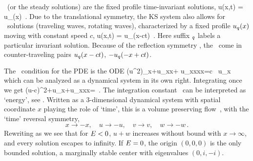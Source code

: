 
\Eqva\  (or the steady solutions)
are the fixed profile time-invariant solutions,
\beq
 u(x,t) = u_\stagn(x) %
\,.
Due to the translational symmetry,
the KS system also allows for \reqv\ solutions
(traveling waves, rotating waves),
characterized by a fixed profile $u_\stagn(x)$
moving with constant speed $c$, {\ie}
\beq
 u(x,t) =  u_\stagn(x-ct) %
\,.
Here suffix ${}_\stagn$ labels a particular invariant solution.
Because of the reflection symmetry ,
the \reqva\ come in counter-traveling pairs
$u_\stagn(x-ct)$, $-u_\stagn(-x+ct)$.

The \reqv\ condition for the {\KS} PDE 
is the ODE
\beq
{\textstyle{}}(u^2)_x+u_{xx}+ u_{xxxx}=c \, u_x
which can be analyzed as a dynamical system in its own right.
Integrating once we get
\beq
{\textstyle{}}(u-c)^2+u_x+u_{xxx}=\expctE
\,.
\label{eq:stdks}
\eeq
The integration constant \expctE\ can be interpreted as `energy',
see .
Written as a 3-dimen\-si\-on\-al dynamical system
with spatial coordinate $x$ playing the role of `time',
this is a volume preserving flow
\beq
{}
\,,
  \label{eq:3dks}
\eeq
with the `time' reversal symmetry,
\[
x \to -x,\quad u \to -u, \quad v \to v, \quad w \to -w \,.
\]
 Rewriting  as
\beq
{} %
we see that
for $E<0$, $u+w$ increases without bound with $x \to \infty$,
and every solution escapes to infinity.
If $E=0$, the origin $(0,0,0)$ is the
only bounded  solution, a marginally stable center with
eigenvalues $(0, i,-i)$.


